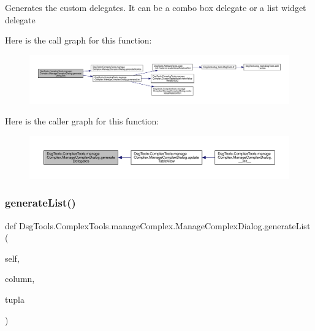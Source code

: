 \begin{DoxyVerb}Generates the custom delegates.
It can be a combo box delegate or a list widget delegate
\end{DoxyVerb}
 Here is the call graph for this function\+:
\nopagebreak
\begin{figure}[H]
\begin{center}
\leavevmode
\includegraphics[width=350pt]{class_dsg_tools_1_1_complex_tools_1_1manage_complex_1_1_manage_complex_dialog_ad00be17c75aa87dc7a60d00ffec6f2df_cgraph}
\end{center}
\end{figure}
Here is the caller graph for this function\+:
\nopagebreak
\begin{figure}[H]
\begin{center}
\leavevmode
\includegraphics[width=350pt]{class_dsg_tools_1_1_complex_tools_1_1manage_complex_1_1_manage_complex_dialog_ad00be17c75aa87dc7a60d00ffec6f2df_icgraph}
\end{center}
\end{figure}
\mbox{\label{class_dsg_tools_1_1_complex_tools_1_1manage_complex_1_1_manage_complex_dialog_a2fddbb8b09feb6e440397a333066d0fd}} 
\subsubsection{\texorpdfstring{generate\+List()}{generateList()}}
{\footnotesize\ttfamily def Dsg\+Tools.\+Complex\+Tools.\+manage\+Complex.\+Manage\+Complex\+Dialog.\+generate\+List (\begin{DoxyParamCaption}\item[{}]{self,  }\item[{}]{column,  }\item[{}]{tupla }\end{DoxyParamCaption})}

